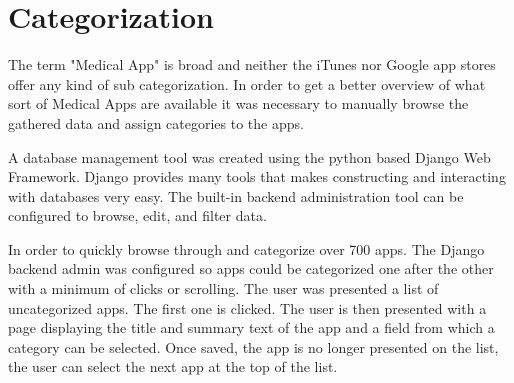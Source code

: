 \section{Categorization}

The term "Medical App" is broad and neither the iTunes nor Google app stores offer any kind of sub categorization. In order to get a better overview of what sort of Medical Apps are available it was necessary to manually browse the gathered data and assign categories to the apps.

A database management tool was created using the python based Django Web Framework. Django provides many tools that makes constructing and interacting with databases very easy. The built-in backend administration tool can be configured to browse, edit, and filter data.

In order to quickly browse through and categorize over 700 apps. The Django backend admin was configured so apps could be categorized one after the other with a minimum of clicks or scrolling. The user was presented a list of uncategorized apps. The first one is clicked. The user is then presented with a page displaying the title and summary text of the app and a field from which a category can be selected. Once saved, the app is no longer presented on the list, the user can select the next app at the top of the list.

